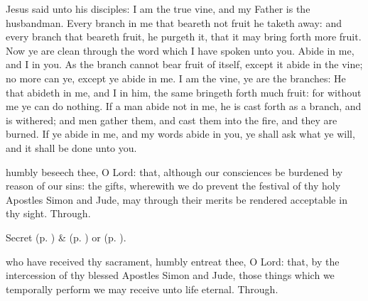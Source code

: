 
 Jesus said unto his disciples: I am the true vine, and my Father is the husbandman. Every branch in me that beareth not fruit he taketh away: and every branch that beareth fruit, he purgeth it, that it may bring forth more fruit. Now ye are clean through the word which I have spoken unto you. Abide in me, and I in you. As the branch cannot bear fruit of itself, except it abide in the vine; no more can ye, except ye abide in me. I am the vine, ye are the branches: He that abideth in me, and I in him, the same bringeth forth much fruit: for without me ye can do nothing. If a man abide not in me, he is cast forth as a branch, and is withered; and men gather them, and cast them into the fire, and they are burned. If ye abide in me, and my words abide in you, ye shall ask what ye will, and it shall be done unto you.


\secret
{} humbly beseech thee, O Lord: that, although our consciences be burdened by reason of our sins: the gifts, wherewith we do prevent the festival of thy holy Apostles Simon and Jude, may through their merits be rendered acceptable in thy sight. Through.

\begin{rubric}
	 Secret  (p. \pageref{SPMaryInEaster}) \&   (p. \pageref{SPAgainst}) or  (p. \pageref{SPChiefBishop}).
\end{rubric}


\postcommunion
{} who have received thy sacrament, humbly entreat thee, O Lord: that, by the intercession of thy blessed Apostles Simon and Jude, those things which we temporally perform we may receive unto life eternal. Through.

